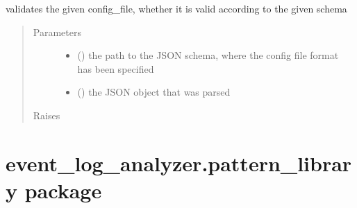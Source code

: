 \documentclass[letterpaper,10pt,english]{sphinxmanual}
\begin{document}

\begin{fulllineitems}
\label{\detokenize{event_log_analyzer:event_log_analyzer.validate.validate_config}}
\sphinxAtStartPar
validates the given config\_file, whether it is valid according to the given schema
\begin{quote}\begin{description}
\item[{Parameters}] \leavevmode\begin{itemize}
\item {} 
\sphinxAtStartPar
{} () \textendash{} the path to the JSON schema, where the config file format has been specified

\item {} 
\sphinxAtStartPar
{} () \textendash{} the JSON object that was parsed

\end{itemize}

\item[{Raises}] \leavevmode
\sphinxAtStartPar
{} \textendash{} 

\end{description}\end{quote}

\end{fulllineitems}



\section{event\_log\_analyzer.pattern\_library package}
\label{\detokenize{event_log_analyzer:event-log-analyzer-pattern-library-package}}
\end{document}
